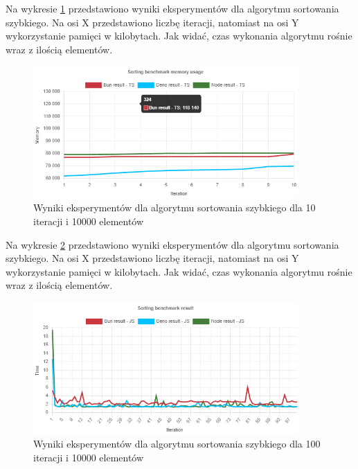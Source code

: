 Na wykresie \ref{fig:radix_sorting_e4_memory_ts} przedstawiono wyniki eksperymentów dla algorytmu sortowania szybkiego. Na osi X przedstawiono liczbę iteracji, natomiast na osi Y wykorzystanie pamięci w kilobytach. Jak widać, czas wykonania algorytmu rośnie wraz z ilością elementów.
\begin{figure}[H]
  \centering
  \includegraphics[width=0.9\textwidth]{Figures/sorting/radix/e4_memory_ts.png}
  \caption{Wyniki eksperymentów dla algorytmu sortowania szybkiego dla 10 iteracji i 10000 elementów}
  \label{fig:radix_sorting_e4_memory_ts}
\end{figure}

Na wykresie \ref{fig:radix_sorting_e5} przedstawiono wyniki eksperymentów dla algorytmu sortowania szybkiego. Na osi X przedstawiono liczbę iteracji, natomiast na osi Y wykorzystanie pamięci w kilobytach. Jak widać, czas wykonania algorytmu rośnie wraz z ilością elementów.
\begin{figure}[H]
  \centering
  \includegraphics[width=0.9\textwidth]{Figures/sorting/radix/e5_js.png}
  \caption{Wyniki eksperymentów dla algorytmu sortowania szybkiego dla 100 iteracji i 10000 elementów}
  \label{fig:radix_sorting_e5}
\end{figure}

